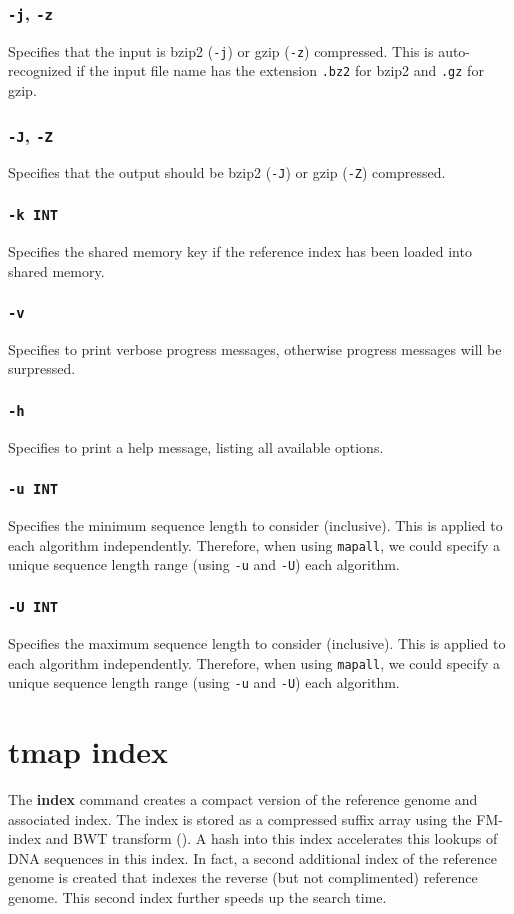 \documentclass[a4paper,12pt]{book}
\newcommand{\TT}[1]{{\tt #1}} %
\newcommand{\BF}[1]{{\bf #1}} %
\begin{document}
\subsubsection{\TT{-j}, \TT{-z}}
Specifies that the input is bzip2 (\TT{-j}) or gzip (\TT{-z}) compressed.
This is auto-recognized if the input file name has the extension \TT{.bz2} for bzip2 and \TT{.gz} for gzip.

\subsubsection{\TT{-J}, \TT{-Z}}
Specifies that the output should be bzip2 (\TT{-J}) or gzip (\TT{-Z}) compressed.

\subsubsection{\TT{-k INT}}
Specifies the shared memory key if the reference index has been loaded into shared memory.

\subsubsection{\TT{-v}}
Specifies to print verbose progress messages, otherwise progress messages will be surpressed.

\subsubsection{\TT{-h}}
Specifies to print a help message, listing all available options.

\subsubsection{\TT{-u INT}}
Specifies the minimum sequence length to consider (inclusive).
This is applied to each algorithm independently.
Therefore, when using \TT{mapall}, we could specify a unique sequence length range (using \TT{-u} and \TT{-U}) each algorithm.

\subsubsection{\TT{-U INT}}
Specifies the maximum sequence length to consider (inclusive).
This is applied to each algorithm independently.
Therefore, when using \TT{mapall}, we could specify a unique sequence length range (using \TT{-u} and \TT{-U}) each algorithm.

\section{tmap index}
\label{sec:index}
The \BF{index} command creates a compact version of the reference genome and associated index.
The index is stored as a compressed suffix array using the FM-index and BWT transform (\cite{FM-index,BWT}).
A hash into this index accelerates this lookups of DNA sequences in this index.
In fact, a second additional index of the reference genome is created that indexes the reverse (but not complimented) reference genome.
This second index further speeds up the search time.
\end{document}
